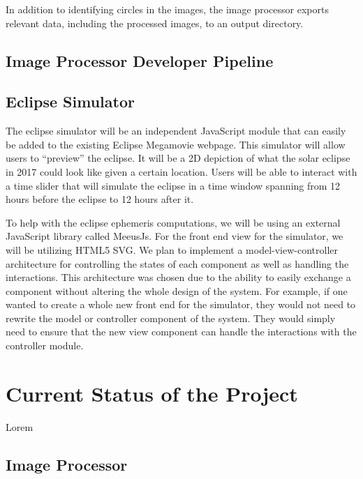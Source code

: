 \documentclass[10pt, onecolumn, draftclsnofoot, letterpaper, compsoc]{IEEEtran}
\begin{document}
In addition to identifying circles in the images, the image processor exports
relevant data, including the processed images, to an output directory. \\

\subsection{Image Processor Developer Pipeline}

\subsection{Eclipse Simulator}

The eclipse simulator will be an independent JavaScript module that can easily
be added to the existing Eclipse Megamovie webpage. This simulator will allow
users to “preview” the eclipse. It will be a 2D depiction of what the solar
eclipse in 2017 could look like given a certain location. Users will be able
to interact with a time slider that will simulate the eclipse in a time
window spanning from 12 hours before the eclipse to 12 hours after it.

To help with the eclipse ephemeris computations, we will be using an external
JavaScript library called MeeusJs. For the front end view for the simulator,
we will be utilizing HTML5 SVG. We plan to implement a model-view-controller
architecture for controlling the states of each component as well as handling
the interactions. This architecture was chosen due to the ability to easily
exchange a component without altering the whole design of the system. For
example, if one wanted to create a whole new front end for the simulator,
they would not need to rewrite the model or controller component of the system.
They would simply need to ensure that the new view component can handle the
interactions with the controller module. \\


\section{Current Status of the Project}

Lorem \\

\subsection{Image Processor}
\end{document}
